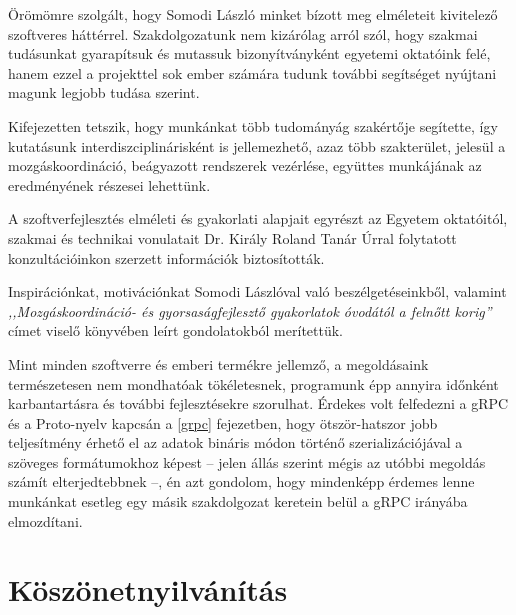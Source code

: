 \documentclass[tocnopagenum]{thesis-ekf}
\theoremstyle{definition}
\theoremstyle{remark}
\begin{document}
	Örömömre szolgált, hogy Somodi László minket bízott meg elméleteit kivitelező szoftveres háttérrel. Szakdolgozatunk nem kizárólag arról szól, hogy szakmai tudásunkat gyarapítsuk és mutassuk bizonyítványként egyetemi oktatóink felé, hanem ezzel a projekttel sok ember számára tudunk további segítséget nyújtani magunk legjobb tudása szerint.
	
	Kifejezetten tetszik, hogy munkánkat több tudományág szakértője segítette, így kutatásunk interdiszciplinárisként is jellemezhető, azaz több szakterület, jelesül a mozgáskoordináció, beágyazott rendszerek vezérlése, együttes munkájának az eredményének részesei lehettünk.
	
	A szoftverfejlesztés elméleti és gyakorlati alapjait egyrészt az Egyetem oktatóitól, szakmai és technikai vonulatait Dr. Király Roland Tanár Úrral folytatott konzultációinkon szerzett információk biztosították. 
	
	Inspirációnkat, motivációnkat Somodi Lászlóval való beszélgetéseinkből, valamint \textit{,,Mozgáskoordináció- és gyorsaságfejlesztő gyakorlatok óvodától a felnőtt korig''} címet viselő könyvében leírt gondolatokból merítettük.
	
	Mint minden szoftverre és emberi termékre jellemző, a megoldásaink természetesen nem mondhatóak tökéletesnek, programunk épp annyira időnként karbantartásra és további fejlesztésekre szorulhat. Érdekes volt felfedezni a gRPC és a Proto-nyelv kapcsán a \ref{grpc} fejezetben, hogy ötször-hatszor jobb teljesítmény érhető el az adatok bináris módon történő szerializációjával a szöveges formátumokhoz képest -- jelen állás szerint mégis az utóbbi megoldás számít elterjedtebbnek --, én azt gondolom, hogy mindenképp érdemes lenne munkánkat esetleg egy másik szakdolgozat keretein belül a gRPC irányába elmozdítani.
	\chapter*{Köszönetnyilvánítás}
	
	
	\listoffigures
\end{document}
